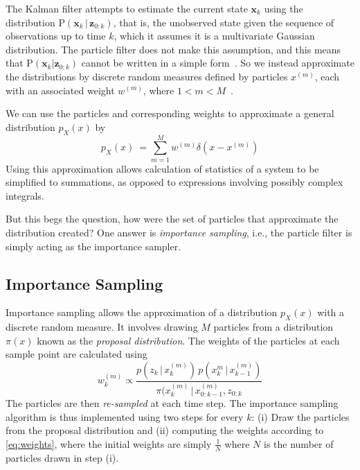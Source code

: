 \documentclass[11pt]{article}
\begin{document}
The Kalman filter attempts to estimate the current state $\mathbf{x}_{k}$ using
the distribution $\textrm{P}(\mathbf{x}_{k}\,|\,\mathbf{z}_{0:k})$, that is, the
unobserved state given the sequence of observations up to time $k$, which
it assumes it is a multivariate Gaussian distribution. The particle filter does
not make this assumption, and this means that
$\textrm{P}(\mathbf{x}_{k}|\mathbf{z}_{0:k})$ cannot be written in a simple
form~{\cite{ref:1}}. So we instead approximate the distributions
by discrete random measures defined by particles $x^{(m)}$, each with an
associated weight $w^{(m)}$, where $1 < m < M$~{\cite{ref:2}}.

We can use the particles and corresponding weights to approximate a general
distribution $p_{X}(x)$ by
\begin{equation}
p_{X}(x) ~= \sum\limits_{m=1}^{M}{w^{(m)}\delta(x-x^{(m)})}
\end{equation}
Using this approximation allows calculation of statistics of a system to be
simplified to summations, as opposed to expressions involving possibly complex
integrals. 

But this begs the question, how were the set of particles that approximate the
distribution created? One answer is \emph{importance sampling}, i.e., the
particle filter is simply acting as the importance sampler.

\subsection{Importance Sampling}
Importance sampling allows the approximation of a distribution $p_{X}(x)$ with
a discrete random measure. It involves drawing $M$ particles from a
distribution $\pi(x)$ known as the \emph{proposal distribution}. The
weights of the particles at each sample point are calculated using
\begin{equation} \label{eq:weights}
w^{(m)}_{k} \propto
\frac
{p(z_{k}\,|\,x^{(m)}_{k})\,p(x^{m}_{k}\,|\,x^{(m)}_{k-1})}{\pi(x^{(m)}_k\,|\,x^{
(m)}_{0:k-1}, z_{0:k}}
\end{equation}
The particles are then \emph{re-sampled} at each time step. The importance
sampling algorithm is thus implemented using two steps for every $k$: (i) Draw
the particles from the proposal distribution and (ii) computing the weights
according to \ref{eq:weights}, where the initial weights are simply
$\frac{1}{N}$ where $N$ is the number of particles drawn in step (i).
\end{document}

